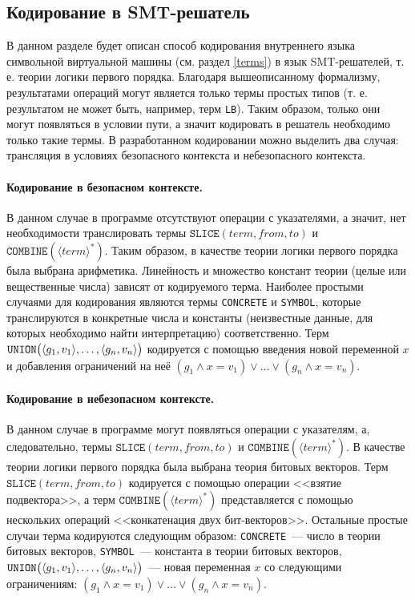 \subsection{Кодирование в SMT-решатель}

В данном разделе будет описан способ кодирования внутреннего языка символьной виртуальной машины (см. раздел \ref{terms}) в язык SMT-решателей, т. е. теории логики первого порядка. Благодаря вышеописанному формализму, результатами операций могут является только термы простых типов (т. е. результатом не может быть, например, терм \texttt{LB}). Таким образом, только они могут появляться в условии пути, а значит кодировать в решатель необходимо только такие термы. В разработанном кодировании можно выделить два случая: трансляция в условиях безопасного контекста и небезопасного контекста.

\paragraph{Кодирование в безопасном контексте.} В данном случае в программе отсутствуют операции с указателями, а значит, нет необходимости транслировать термы $\texttt{SLICE}(term, from, to)$ и $\texttt{COMBINE}(\langle term \rangle ^*)$. Таким образом, в качестве теории логики первого порядка была выбрана арифметика. Линейность и множество констант теории (целые или вещественные числа) зависят от кодируемого терма. Наиболее простыми случаями для кодирования являются термы \texttt{CONCRETE} и \texttt{SYMBOL}, которые транслируются в конкретные числа и константы (неизвестные данные, для которых необходимо найти интерпретацию) соответственно. Терм $\texttt{UNION}\big(\langle g_1, v_1\rangle,\ldots,\langle g_n, v_n\rangle\big)$ кодируется с помощью введения новой переменной $x$ и добавления ограничений на неё $(g_1 \land x = v_1) \lor \ldots \lor (g_n \land x = v_n)$.

\paragraph{Кодирование в небезопасном контексте.} В данном случае в программе могут появляться операции с указателям, а, следовательно, термы $\texttt{SLICE}(term, from, to)$ и $\texttt{COMBINE}(\langle term \rangle ^*)$. В качестве теории логики первого порядка была выбрана теория битовых векторов. Терм $\texttt{SLICE}(term, from, to)$ кодируется с помощью операции <<взятие подвектора>>, а терм $\texttt{COMBINE}(\langle term \rangle ^*)$ представляется с помощью нескольких операций <<конкатенация двух бит-векторов>>. Остальные простые случаи терма кодируются следующим образом: \texttt{CONCRETE}~--- число в теории битовых векторов, \texttt{SYMBOL}~--- константа в теории битовых векторов,  $\texttt{UNION}\big(\langle g_1, v_1\rangle,\ldots,\langle g_n, v_n\rangle\big)$~--- новая переменная $x$ со следующими ограничениям: $(g_1 \land x = v_1) \lor \ldots \lor (g_n \land x = v_n)$.


